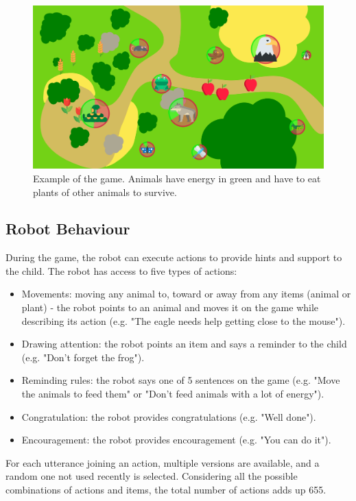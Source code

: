 \begin{figure}[ht]
	\centering
		\includegraphics[width=1\textwidth]{game.png}
		\captionsetup{width=.9\linewidth}
		\caption{Example of the game. Animals have energy in green and have to eat plants of other animals to survive.}
		\label{fig:tutoring_game}
\end{figure}

\subsection{Robot Behaviour}
 
During the game, the robot can execute actions to provide hints and support to the child. The robot has access to five types of actions:
\begin{itemize}
	\item Movements: moving any animal to, toward or away from any items (animal or plant) - the robot points to an animal and moves it on the game while describing its action (e.g. "The eagle needs help getting close to the mouse").
	\item Drawing attention: the robot points an item and says a reminder to the child (e.g. "Don't forget the frog").
	\item Reminding rules: the robot says one of 5 sentences on the game (e.g. "Move the animals to feed them" or "Don't feed animals with a lot of energy").
	\item Congratulation: the robot provides congratulations (e.g. "Well done").
	\item Encouragement: the robot provides encouragement (e.g. "You can do it").
\end{itemize}

For each utterance joining an action, multiple versions are available, and a random one not used recently is selected. Considering all the possible combinations of actions and items, the total number of actions adds up 655.

